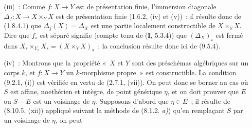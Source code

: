 (iii)~: Comme $f:X\to Y$ est de présentation finie, l'immersion diagonale
$\Delta_f:X\to X\times_YX$ est de présentation finie (1.6.2, (iv) et (v))~; il
résulte donc de (1.8.4.1) que $\Delta_f(X)=\Delta_X$ est une partie localement
constructible de $X\times_YX$. Dire que $f_s$ est séparé signifie (compte tenu
de (\textbf{I}, 5.3.4)) que $(\Delta_X)_s$ est fermé dans
$X_s\times_{Y_s}X_s=(X\times_YX)_s$~; la conclusion résulte donc ici de
(9.5.4).

(iv)~: Montrons que la propriété «~$X$ et $Y$ sont des préschémas algébriques
sur un corps $k$, et $f:X\to Y$ un $k$-morphisme propre~» est constructible. La
condition (9.2.1, (i)) est vérifiée en vertu de (2.7.1, (vii)). On peut donc se
borner au cas où $S$ est affine, noethérien et intègre, de point générique
$\eta$, et on doit prouver que $E$ ou $S-E$ est un voisinage de $\eta$.
Supposons d'abord que $\eta\in E$~; il résulte de (8.10.5, (xii)) appliqué
suivant la méthode de (8.1.2, \emph{a)}) qu'en remplaçant $S$ par un voisinage
de $\eta$, on peut

